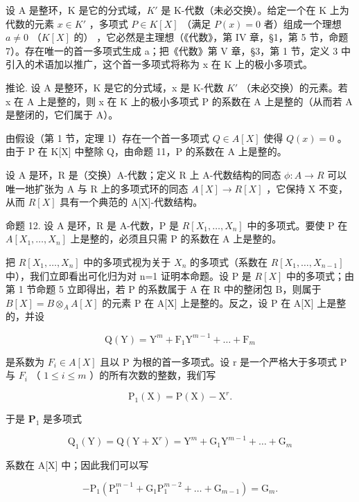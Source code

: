 设 A 是整环，K 是它的分式域，\(K'\) 是 K-代数（未必交换）。给定一个在 K 上为代数的元素 \(x \in K'\) ，多项式 \(P \in K[X]\) （满足 \(P(x) = 0\) 者）组成一个理想 \(a \neq 0\) （\(K[X]\) 的） ，它必然是主理想（《代数》，第 IV 章，§1，第 5 节，命题 7）。存在唯一的首一多项式生成 a；把《代数》第 V 章，§3，第 1 节，定义 3 中引入的术语加以推广，这个首一多项式将称为 x 在 K 上的极小多项式。

推论. 设 A 是整环，K 是它的分式域，x 是 K-代数 \(K'\) （未必交换）的元素。若 x 在 A 上是整的，则 x 在 K 上的极小多项式 P 的系数在 A 上是整的（从而若 A 是整闭的，它们属于 A）。

由假设（第 1 节，定理 1）存在一个首一多项式 \(Q \in A[X]\) 使得 \(Q(x) = 0\) 。由于 P 在 K{[}X{]} 中整除 Q，由命题 11，P 的系数在 A 上是整的。

设 A 是环，R 是（交换）A-代数；定义 R 上 A-代数结构的同态 \(\phi: A \rightarrow R\) 可以唯一地扩张为 A 与 R 上的多项式环的同态 \(A[X] \rightarrow R[X]\) ，它保持 X 不变，从而 \(R[X]\) 具有一个典范的 A{[}X{]}-代数结构。

命题 12. 设 A 是环，R 是 A-代数，P 是 \(R[X_{1},\ldots,X_{n}]\) 中的多项式。要使 P 在 \(A[X_{1},\ldots,X_{n}]\) 上是整的，必须且只需 P 的系数在 A 上是整的。

把 \(R[X_{1},\ldots,X_{n}]\) 中的多项式视为关于 \(X_{n}\) 的多项式（系数在 \(R[X_{1},\ldots,X_{n-1}]\) 中），我们立即看出可化归为对 n=1 证明本命题。设 P 是 \(R[X]\) 中的多项式；由第 1 节命题 5 立即得出，若 P 的系数属于 A 在 R 中的整闭包 B，则属于 \(B[X]=B\otimes_{A}A[X]\) 的元素 P 在 A{[}X{]} 上是整的。反之，设 P 在 A{[}X{]} 上是整的，并设

\[
\mathrm{Q} (\mathrm{Y}) = \mathrm{Y} ^ {m} + \mathrm{F} _ {1} \mathrm{Y} ^ {m - 1} + \dots + \mathrm{F} _ {m}
\]

是系数为 \(F_{i} \in A[X]\) 且以 P 为根的首一多项式。设 r 是一个严格大于多项式 P 与 \(F_{i}\) （ \(1 \leqslant i \leqslant m\) ）的所有次数的整数，我们写

\[
\mathrm{P} _ {1} (\mathrm{X}) = \mathrm{P} (\mathrm{X}) - \mathrm{X} ^ {r}.
\]

于是 \(\mathbf{P}_1\) 是多项式

\[
\mathrm{Q} _ {1} (\mathrm{Y}) = \mathrm{Q} (\mathrm{Y} + \mathrm{X} ^ {r}) = \mathrm{Y} ^ {m} + \mathrm{G} _ {1} \mathrm{Y} ^ {m - 1} + \dots + \mathrm{G} _ {m}
\]

系数在 A{[}X{]} 中；因此我们可以写

\[
- \mathrm{P} _ {1} (\mathrm{P} _ {1} ^ {m - 1} + \mathrm{G} _ {1} \mathrm{P} _ {1} ^ {m - 2} + \dots + \mathrm{G} _ {m - 1}) = \mathrm{G} _ {m}.\tag{1}
\]

